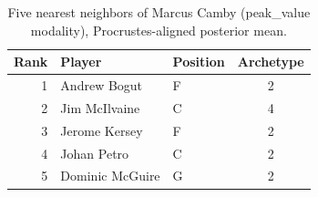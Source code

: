 \begin{table}[htbp]
  \centering\small
  \begin{tabular}{rllc}
    \toprule
    Rank & Player & Position & Archetype \\
    \midrule
    1 & Andrew Bogut & F & 2 \\
    2 & Jim McIlvaine & C & 4 \\
    3 & Jerome Kersey & F & 2 \\
    4 & Johan Petro & C & 2 \\
    5 & Dominic McGuire & G & 2 \\
    \bottomrule
  \end{tabular}
  \caption{Five nearest neighbors of Marcus Camby (peak_value modality), Procrustes-aligned posterior mean.}
  \label{tab:Marcus_Camby_neighbors_peak_value}
\end{table}

